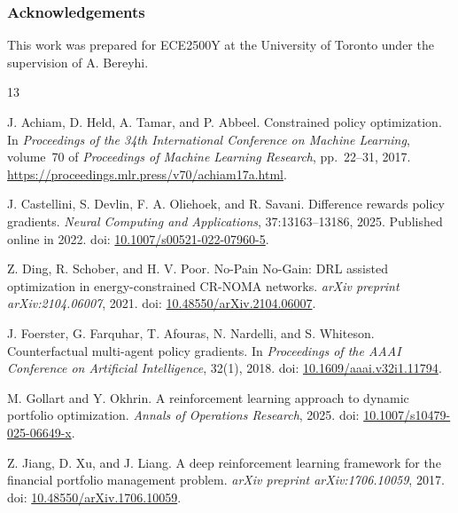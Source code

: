 \documentclass[10pt]{article}
\begin{document}
\subsubsection*{Acknowledgements}
This work was prepared for ECE2500Y at the University of Toronto under the supervision of A. Bereyhi.

\clearpage
\begin{thebibliography}{13}

J. Achiam, D. Held, A. Tamar, and P. Abbeel.
Constrained policy optimization.
In \emph{Proceedings of the 34th International Conference on Machine Learning},
volume~70 of \emph{Proceedings of Machine Learning Research}, pp.~22--31, 2017.
\url{https://proceedings.mlr.press/v70/achiam17a.html}.

J. Castellini, S. Devlin, F. A. Oliehoek, and R. Savani.
Difference rewards policy gradients.
\emph{Neural Computing and Applications}, 37:13163--13186, 2025.
Published online in 2022.
doi: \href{https://doi.org/10.1007/s00521-022-07960-5}{10.1007/s00521-022-07960-5}.

Z. Ding, R. Schober, and H. V. Poor.
No-Pain No-Gain: DRL assisted optimization in energy-constrained CR-NOMA networks.
\emph{arXiv preprint arXiv:2104.06007}, 2021.
doi: \href{https://doi.org/10.48550/arXiv.2104.06007}{10.48550/arXiv.2104.06007}.

J. Foerster, G. Farquhar, T. Afouras, N. Nardelli, and S. Whiteson.
Counterfactual multi-agent policy gradients.
In \emph{Proceedings of the AAAI Conference on Artificial Intelligence},
32(1), 2018.
doi: \href{https://doi.org/10.1609/aaai.v32i1.11794}{10.1609/aaai.v32i1.11794}.

M. Gollart and Y. Okhrin.
A reinforcement learning approach to dynamic portfolio optimization.
\emph{Annals of Operations Research}, 2025.
doi: \href{https://doi.org/10.1007/s10479-025-06649-x}{10.1007/s10479-025-06649-x}.

Z. Jiang, D. Xu, and J. Liang.
A deep reinforcement learning framework for the financial portfolio management problem.
\emph{arXiv preprint arXiv:1706.10059}, 2017.
doi: \href{https://doi.org/10.48550/arXiv.1706.10059}{10.48550/arXiv.1706.10059}.


\end{thebibliography}
\end{document}
